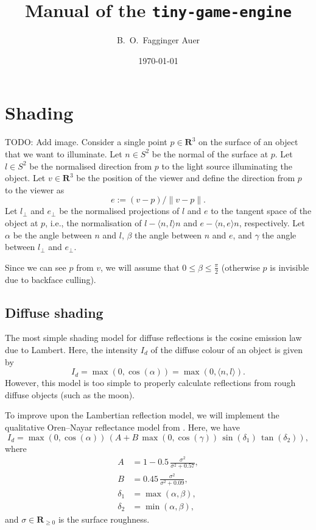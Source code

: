 \documentclass{article}
\theoremstyle{definition}
\theoremstyle{remark}
\newcommand{\R}{\mathbf{R}}
\begin{document}
\title{Manual of the \texttt{tiny-game-engine}}

\author{B.~O.~Fagginger Auer}

\date{\today}

\maketitle

\section{Shading}

TODO: Add image.
Consider a single point $p \in \R^3$ on the surface of an object that we want to illuminate.
Let $n \in S^2$ be the normal of the surface at $p$.
Let $l \in S^2$ be the normalised direction from $p$ to the light source illuminating the object.
Let $v \in \R^3$ be the position of the viewer and define the direction from $p$ to the viewer as
$$e := (v - p)/\|v - p\|.$$
Let $l_\perp$ and $e_\perp$ be the normalised projections of $l$ and $e$ to the tangent space of the object at $p$, i.e., the normalisation of $l - \langle n, l \rangle n$ and $e - \langle n, e \rangle n$, respectively.
Let $\alpha$ be the angle between $n$ and $l$, $\beta$ the angle between $n$ and $e$, and $\gamma$ the angle between $l_\perp$ and $e_\perp$.

Since we can see $p$ from $v$, we will assume that $0 \leq \beta \leq \frac{\pi}{2}$ (otherwise $p$ is invisible due to backface culling).

\subsection{Diffuse shading}

The most simple shading model for diffuse reflections is the cosine emission law due to Lambert.
Here, the intensity $I_d$ of the diffuse colour of an object is given by
\begin{equation} \label{eq:shading:lambert}
I_d = \max(0, \cos(\alpha)) = \max(0, \langle n, l \rangle).
\end{equation}
However, this model is too simple to properly calculate reflections from rough diffuse objects (such as the moon).

To improve upon the Lambertian reflection model, we will implement the qualitative Oren--Nayar reflectance model from \cite[\S 4.4]{Oren1994}.
Here, we have
\begin{equation} \label{eq:shading:orennayar}
I_d = \max(0, \cos(\alpha)) \, \left( A + B \, \max(0, \cos(\gamma)) \, \sin(\delta_1) \, \tan(\delta_2) \right),
\end{equation}
where
\begin{align*}
A & = 1 - 0.5 \, \frac{\sigma^2}{\sigma^2 + 0.57}, \\
B & = 0.45 \, \frac{\sigma^2}{\sigma^2 + 0.09}, \\
\delta_1 & = \max(\alpha, \beta), \\
\delta_2 & = \min(\alpha, \beta),
\end{align*}
and $\sigma \in \R_{\geq 0}$ is the surface roughness.
\end{document}
